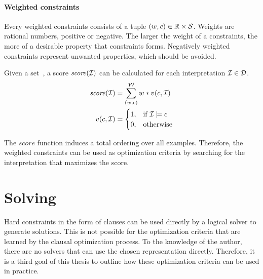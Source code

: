 \paragraph{Weighted constraints}
Every weighted constraints consists of a tuple $(w, c) \in \mathbb{R} \times \mathcal{S}$.
Weights are rational numbers, positive or negative.
The larger the weight of a constraints, the more of a desirable property that constraints forms.
Negatively weighted constraints represent unwanted properties, which should be avoided.

Given a set~, a score $\mathit{score}(\mathcal{I})$ can be calculated for each interpretation $\mathcal{I} \in \mathcal{D}$.
\begin{align*}
	\mathit{score}(\mathcal{I}) &= \sum\limits_{(w, c)}^{\mathcal{W}} w * v(c, \mathcal{I}) \\
	v(c, \mathcal{I}) &=
	\begin{cases}
		1,& \text{if } \mathcal{I} \models c\\
		0,& \text{otherwise}
	\end{cases}
\end{align*}

The $\mathit{score}$ function induces a total ordering over all examples.
Therefore, the weighted constraints  can be used as optimization criteria by searching for the interpretation that maximizes the score.

\section{Solving}
Hard constraints in the form of clauses can be used directly by a logical solver to generate solutions.
This is not possible for the optimization criteria that are learned by the clausal optimization process.
To the knowledge of the author, there are no solvers that can use the chosen representation directly.
Therefore, it is a third goal of this thesis to outline how these optimization criteria can be used in practice.